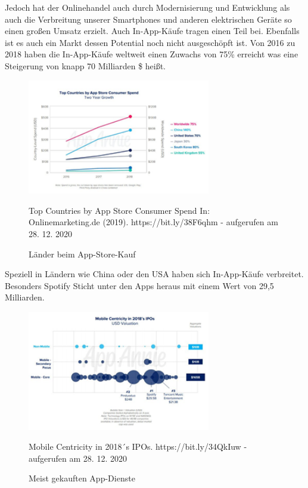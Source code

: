 \noindent Jedoch hat der Onlinehandel auch durch Modernisierung und Entwicklung als auch die Verbreitung unserer Smartphones und anderen elektrischen Geräte so einen großen Umsatz erzielt. Auch In-App-Käufe tragen einen Teil bei. Ebenfalls ist es auch ein Markt dessen Potential noch nicht ausgeschöpft ist. Von 2016 zu 2018 haben die In-App-Käufe weltweit einen Zuwachs von 75\% erreicht was eine Steigerung von knapp 70 Milliarden \$ heißt.

 \begin{figure}[h]
    \begin{center}
        \includegraphics[width=8cm]{media/2.png}
        \caption{Länder beim App-Store-Kauf}
        \label{Länder Ranking}
        \bildquelle Top Countries by App Store Consumer Spend In: Onlinemarketing.de (2019). https://bit.ly/38F6qhm - aufgerufen am 28. 12. 2020
    \end{center}
\end{figure}


\noindent Speziell in Ländern wie China oder den USA haben sich In-App-Käufe verbreitet. Besonders Spotify Sticht unter den Apps heraus mit einem Wert von 29,5 Milliarden. 

 \begin{figure}[h]
    \begin{center}
        \includegraphics[width=8cm]{media/3.png}
        \caption{Meist gekauften App-Dienste }
        \label{App-Dienste}
        \bildquelle Mobile Centricity in 2018´s IPOs. https://bit.ly/34QkIuw - aufgerufen am 28. 12. 2020
    \end{center}
\end{figure}

